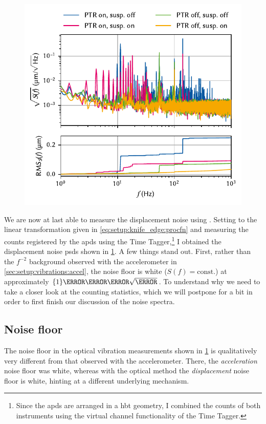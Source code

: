 \begin{figure}
    \centering
    \includegraphics{img/pdf/setup/spect_optic}
    \caption[]{}
    \label{fig:setup:vibrations:optic}
\end{figure}

We are now at last able to measure the displacement noise using \pyspeck.
Setting  to the linear transformation given in \cref{eq:setup:knife_edge:procfn} and measuring the counts registered by the \glspl{apd} using the Time Tagger,\footnote{
    Since the \glspl{apd} are arranged in a \gls{hbt} geometry, I combined the counts of both instruments using the virtual channel functionality of the Time Tagger.
}
I obtained the displacement noise \glspl{psd} shown in \cref{fig:setup:vibrations:optic}.
A few things stand out.
First, rather than the $f^{-2}$ background observed with the accelerometer in \cref{sec:setup:vibrations:accel}, the noise floor is white ($S(f)=\text{const.}$) at approximately $\qty{1}{\nano\meter\per\sqrt{\hertz}}$.
To understand why we need to take a closer look at the counting statistics, which we will postpone for a bit in order to first finish our discussion of the noise spectra.

\subsection{Noise floor}\label{subsec:setup:vibrations:optic:noise_floor}
The noise floor in the optical vibration measurements shown in \cref{fig:setup:vibrations:optic} is qualitatively very different from that observed with the accelerometer.
There, the \emph{acceleration} noise floor was white,
whereas with the optical method the \emph{displacement} noise floor is white, hinting at a different underlying mechanism.

